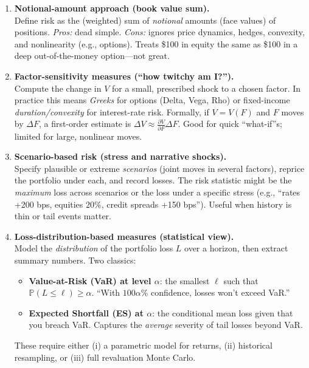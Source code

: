 \begin{enumerate}
  \item \textbf{Notional-amount approach (book value sum).}\\
  Define risk as the (weighted) sum of \emph{notional} amounts (face values) of positions. \emph{Pros:} dead simple. \emph{Cons:} ignores price dynamics, hedges, convexity, and nonlinearity (e.g., options). Treats \$100 in equity the same as \$100 in a deep out-of-the-money option---not great.

  \item \textbf{Factor-sensitivity measures (``how twitchy am I?'').}\\
  Compute the change in \(V\) for a small, prescribed shock to a chosen factor. In practice this means \emph{Greeks} for options (Delta, Vega, Rho) or fixed-income \emph{duration/convexity} for interest-rate risk. Formally, if \(V=V(F)\) and \(F\) moves by \(\Delta F\), a first-order estimate is \(\Delta V \approx \frac{\partial V}{\partial F}\Delta F\). Good for quick “what-if”s; limited for large, nonlinear moves.

  \item \textbf{Scenario-based risk (stress and narrative shocks).}\\
  Specify plausible or extreme \emph{scenarios} (joint moves in several factors), reprice the portfolio under each, and record losses. The risk statistic might be the \emph{maximum} loss across scenarios or the loss under a specific stress (e.g., “rates +200 bps, equities $20\%$, credit spreads +150 bps”). Useful when history is thin or tail events matter.

  \item \textbf{Loss-distribution-based measures (statistical view).}\\
  Model the \emph{distribution} of the portfolio loss \(L\) over a horizon, then extract summary numbers. Two classics:
  \begin{itemize}
    \item \textbf{Value-at-Risk (VaR) at level \(\alpha\)}: the smallest \(\ell\) such that \(\mathbb{P}(L\le \ell)\ge \alpha\). “With \(100\alpha\%\) confidence, losses won’t exceed VaR.”
    \item \textbf{Expected Shortfall (ES) at \(\alpha\)}: the conditional mean loss given that you breach VaR. Captures the \emph{average} severity of tail losses beyond VaR.
  \end{itemize}
  These require either (i) a parametric model for returns, (ii) historical resampling, or (iii) full revaluation Monte Carlo.
\end{enumerate}

